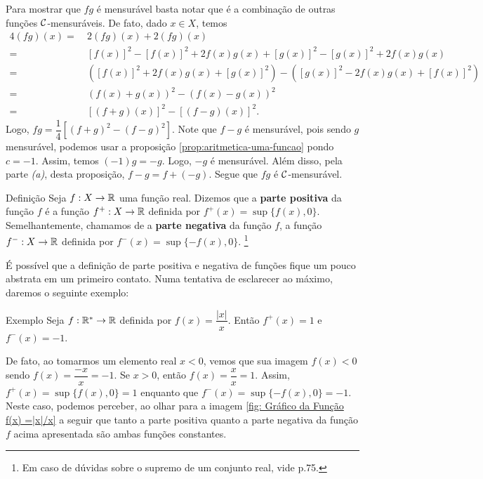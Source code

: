 \begin{prova}
    Para mostrar que $fg$ é mensurável basta notar que é a combinação de outras funções $\operatorname{\mathcal{C}}$-mensuráveis.
    De fato, dado $x \in X$, temos
	    \begin{align*}
	        4(fg)(x) 
	        =& \ 2(fg)(x) +  2(fg)(x)\\
	        =& \ [f(x)]^2 - [f(x)]^2 + 2f(x)g(x) + [g(x)]^2 - [g(x)]^2 + 2f(x)g(x)\\
	        =& \ \left([f(x)]^2 + 2f(x)g(x) + [g(x)]^2\right)  - \left([g(x)]^2 - 2f(x)g(x) + [f(x)]^2\right)\\
	        =& \ (f(x) +g(x))^2 - (f(x) - g(x))^2\\
	        =& \ [(f+g)(x)]^2 - [(f-g)(x)]^2.
	    \end{align*}
    Logo, $fg = \dfrac{1}{4}\left[(f+g)^2 - (f-g)^2\right]$.
    Note que  $f-g$ é mensurável, pois sendo $g$ mensurável, podemos usar a proposição \ref{prop:aritmetica-uma-funcao} pondo $c= -1$.
    Assim, temos $(-1)g = -g$. Logo, $-g$ é mensurável.
    Além disso, pela parte \textit{(a)}, desta proposição, $f - g = f+ (-g)$.
    Segue que $fg$ é $\operatorname{\mathcal{C}}$-mensurável.
\end{prova}

\begin{resultado}{Definição}
	\label{def:parte-positiva e negativa}
    Seja $f: X \to \mathbb{R}$ uma função real. Dizemos que a \textbf{parte positiva} da função $f$ é a função $f^+: X \to \mathbb{R}$ definida por $f^+(x) = \sup\{f(x), 0\}$.
    Semelhantemente, chamamos de a \textbf{parte negativa} da função $f$, a função $f^-: X \to \mathbb{R}$ definida por $f^-(x) = \sup\{-f(x), 0\}$.
    \footnote{Em caso de dúvidas sobre o supremo de um conjunto real, vide \supercite{elon}{p.75}.}
\end{resultado}

É possível  que a definição de parte positiva e negativa de funções fique um pouco abstrata em um primeiro contato. 
Numa tentativa de esclarecer ao máximo, daremos o seguinte exemplo:
\begin{resultado}{Exemplo}
    Seja $f: \mathbb{R}^* \to \mathbb{R}$ definida por $f(x) =\dfrac{|x|}{x}$. 
    Então $f^+(x) = 1$ e $f^-(x) = -1$.
\end{resultado}

De fato, ao tomarmos um elemento real $x< 0$, vemos que sua imagem $f(x) < 0$ sendo $f(x) = \dfrac{-x}{x} = -1$.
Se $x>0$, então $f(x) =\dfrac{x}{x} = 1$. 
Assim, $f^+(x) = \sup\{f(x), 0\} = 1$ enquanto que $f^-(x) = \sup\{-f(x), 0\} = -1$.
Neste caso, podemos perceber, ao olhar para a imagem \ref{fig: Gráfico da Função f(x) =|x|/x} a seguir que tanto a parte positiva quanto a parte negativa da função $f$ acima apresentada são ambas funções constantes.\\

